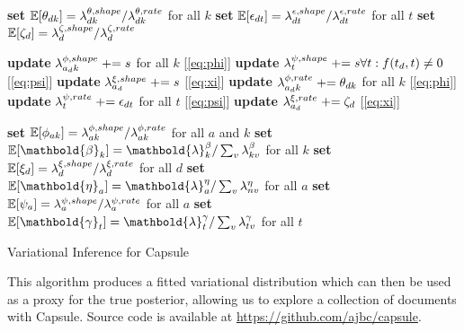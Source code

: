\begin{algorithm}[p]
{{		\textbf{set} $\mathbb{E}[\theta_{dk}] = \lambda^{\theta,shape}_{dk} / \lambda^{\theta,rate}_{dk}$ for all $k$\;
		\textbf{set} $\mathbb{E}[\epsilon_{dt}] = \lambda^{\epsilon,shape}_{dt} / \lambda^{\epsilon,rate}_{dt}$ for all $t$\;
		\textbf{set} $\mathbb{E}[\zeta_d] = \lambda^{\zeta,shape}_d / \lambda^{\zeta,rate}_d$ \;
		
		\textbf{update} $\lambda^{\phi,shape}_{a_d k} \mathrel{+}= s$ for all $k$ [\cref{eq:phi}] \;
		\textbf{update} $\lambda^{\psi,shape}_{t} \mathrel{+}= s \forall t : f(t_d, t) \neq 0$ [\cref{eq:psi}] \;
		\textbf{update} $\lambda^{\xi,shape}_{a_d} \mathrel{+}= s$ [\cref{eq:xi}] \;
		\textbf{update} $\lambda^{\phi,rate}_{a_d k} \mathrel{+}= \theta_{dk}$ for all $k$ [\cref{eq:phi}] \;
		\textbf{update} $\lambda^{\psi,rate}_t \mathrel{+}= \epsilon_{dt}$ for all $t$ [\cref{eq:psi}] \;
		\textbf{update} $\lambda^{\xi,rate}_{a_d} \mathrel{+}= \zeta_d$ [\cref{eq:xi}] \;

	}

	\textbf{set} $\mathbb{E}[\phi_{ak}] = \lambda^{\phi,shape}_{ak} / \lambda^{\phi,rate}_{ak}$ for all $a$ and $k$ \;
	\textbf{set} $\E[\mathbold{\beta}_{k}] = \mathbold{\lambda}^{\beta}_{k} / \sum_v \lambda^{\beta}_{kv}$ for all $k$ \;
	\textbf{set} $\mathbb{E}[\xi_{d}] = \lambda^{\xi,shape}_d / \lambda^{\xi,rate}_d$ for all $d$ \;
	\textbf{set} $\E[\mathbold{\eta}_{a}] = \mathbold{\lambda}^{\eta}_{a} / \sum_v \lambda^{\eta}_{nv}$ for all $a$ \;
	\textbf{set} $\mathbb{E}[\psi_a] = \lambda^{\psi,shape}_a / \lambda^{\psi,rate}_a$ for all $a$\;
	\textbf{set} $\E[\mathbold{\gamma}_t] = \mathbold{\lambda}^{\gamma}_t / \sum_v \lambda^{\gamma}_{tv}$ for all $t$ \;
}
\Return{$\mathbold{\lambda}$} \;
\caption{Variational Inference for Capsule}
\label{alg:capsule}
\end{algorithm}

This algorithm produces a fitted variational distribution which can then be used as a proxy for the true posterior, allowing us to explore a collection of documents with Capsule.  Source code is available at \url{https://github.com/ajbc/capsule}.


